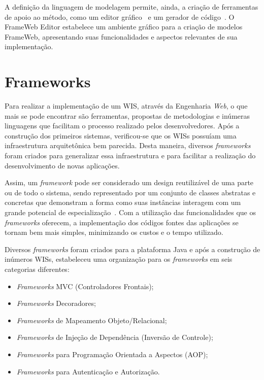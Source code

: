 A definição da linguagem de modelagem permite, ainda, a criação de ferramentas de apoio ao método, como um editor gráfico~\cite{campos-souza:webmedia17} e um gerador de código~\cite{almeida-et-al:webmedia17}. O FrameWeb Editor estabelece um ambiente gráfico para a criação de modelos FrameWeb, apresentando suas funcionalidades e aspectos relevantes de sua implementação.  



\section{Frameworks}
\label{sec-ref-frameworks}

Para realizar a implementação de um WIS, através da Engenharia \textit{Web}, o que mais se pode encontrar são ferramentas, propostas de metodologias e inúmeras linguagens que facilitam o processo realizado pelos desenvolvedores. Após a construção dos primeiros sistemas, verificou-se que os WISs possuíam uma infraestrutura arquitetônica bem parecida. Desta maneira, diversos \textit{frameworks} foram criados para generalizar essa infraestrutura e para facilitar a realização do desenvolvimento de novas aplicações.

Assim, um \textit{framework} pode ser considerado um design reutilizável de uma parte ou de todo o sistema, sendo representado por um conjunto de classes abstratas e concretas que demonstram a forma como suas instâncias interagem com um grande potencial de especialização~\cite{mattsson-et-al:csef99}. Com a utilização das funcionalidades que os \textit{frameworks} oferecem, a implementação dos códigos fontes das aplicações se tornam bem mais simples, minimizando os custos e o tempo utilizado.

Diversos \textit{frameworks} foram criados para a plataforma Java e após a construção de inúmeros WISs,  estabeleceu uma organização para os \textit{frameworks} em seis categorias diferentes:    

\begin{itemize} 
	
	\item \textit{Frameworks} MVC (Controladores Frontais);
	
	\item \textit{Frameworks} Decoradores;
	
	\item \textit{Frameworks} de Mapeamento Objeto/Relacional;
	
	\item \textit{Frameworks} de Injeção de Dependência (Inversão de Controle);
	
	\item \textit{Frameworks} para Programação Orientada a Aspectos (AOP);
	
	\item \textit{Frameworks} para Autenticação e Autorização.
   
\end{itemize}

